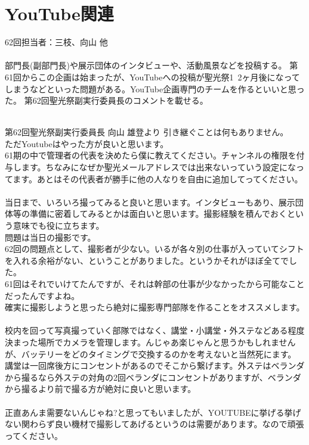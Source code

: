 \documentclass[dvipdfmx,jb5]{jreport}
\begin{document}
\section{YouTube関連}
62回担当者：三枝、向山 他
\\
\\
部門長(副部門長)や展示団体のインタビューや、活動風景などを投稿する。
第61回からこの企画は始まったが、YouTubeへの投稿が聖光祭1~2ヶ月後になってしまうなどといった問題がある。YouTube企画専門のチームを作るといいと思った。
第62回聖光祭副実行委員長のコメントを載せる。
\\
\\
\begin{itembox}[l]{第62回聖光祭副実行委員長 向山 雄登より}
      引き継ぐことは何もありません。\\
      ただYoutubeはやった方が良いと思います。\\
      61期の中で管理者の代表を決めたら僕に教えてください。チャンネルの権限を付与します。ちなみになぜか聖光メールアドレスでは出来ないっていう設定になってます。あとはその代表者が勝手に他の人なりを自由に追加してってください。\\\\
      当日まで、いろいろ撮ってみると良いと思います。インタビューもあり、展示団体等の準備に密着してみるとかは面白いと思います。撮影経験を積んでおくという意味でも役に立ちます。\\
      問題は当日の撮影です。\\
      62回の問題点として、撮影者が少ない。いるが各々別の仕事が入っていてシフトを入れる余裕がない、ということがありました。というかそれがほぼ全てでした。\\
      61回はそれでいけてたんですが、それは幹部の仕事が少なかったから可能なことだったんですよね。\\
      確実に撮影しようと思ったら絶対に撮影専門部隊を作ることをオススメします。\\\\
      校内を回って写真撮っていく部隊ではなく、講堂・小講堂・外ステなどある程度決まった場所でカメラを管理します。んじゃあ楽じゃんと思うかもしれませんが、バッテリーをどのタイミングで交換するのかを考えないと当然死にます。\\
      講堂は一回席後方にコンセントがあるのでそこから繋げます。外ステはベランダから撮るなら外ステの対角の2回ベランダにコンセントがありますが、ベランダから撮るより前で撮る方が絶対に良いと思います。\\\\
      正直あんま需要ないんじゃね?と思ってもいましたが、YOUTUBEに挙げる挙げない関わらず良い機材で撮影してあげるというのは需要があります。なので頑張ってください。
\end{itembox}
\end{document}
